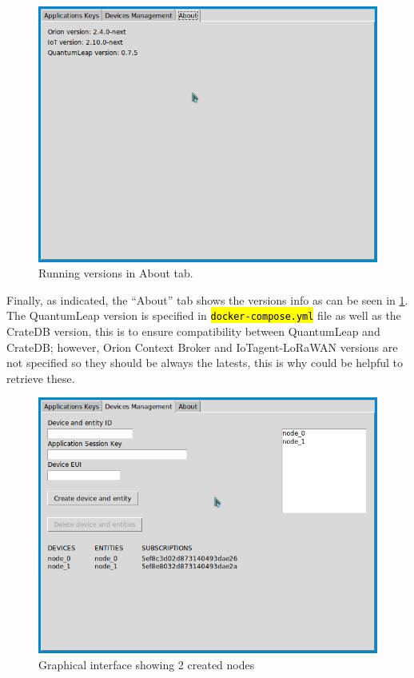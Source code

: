 \documentclass[11pt,a4paper,dvipsnames,twoside]{article}
\newcommand{\cmd}[1] {\hl{\texttt{#1}}}
\begin{document}
\begin{figure}[htp]
  \centering
  \includegraphics[width=.9\textwidth]{../pictures/GUI_about_tab.png}
  \caption{Running versions in About tab.}
  \label{fig:about_tab}
\end{figure}

Finally, as indicated, the \enquote{About} tab shows the versions info as can be seen in \ref{fig:about_tab}. The QuantumLeap version is specified in \cmd{docker-compose.yml} file as well as the CrateDB version, this is to ensure compatibility between QuantumLeap and CrateDB; however, Orion Context Broker and IoTagent-LoRaWAN versions are not specified so they should be always the latests, this is why could be helpful to retrieve these. 

\begin{figure}[ht]
  \centering
  \includegraphics[width=.9\textwidth]{../pictures/GUI_device_management_2nodes.png}
  \caption{Graphical interface showing 2 created nodes}
  \label{fig:GUI_2nodes}
\end{figure}
\end{document}
